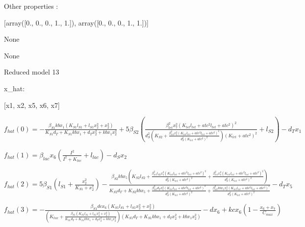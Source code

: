 Other properties :


[array([0., 0., 0., 1., 1.]), array([0., 0., 0., 1., 1.])]

None

None

Reduced model 13

x_{hat}: 

[x1, x2, x5, x6, x7]


$f_{hat}(0)=- \frac{\beta_{S1} kb x_{1} \left(K_{S1} l_{S1} + l_{S1} x_{2}^{2} + x_{2}^{2}\right)}{K_{S1} d_{T} + K_{S1} kb x_{1} + d_{T} x_{2}^{2} + kb x_{1} x_{2}^{2}} + 5 \beta_{S2} \left(\frac{\beta_{tet}^{2} x_{7}^{2} \left(K_{tet} l_{tet} + atc^{2} l_{tet} + atc^{2}\right)^{2}}{d_{S}^{2} \left(K_{S2} + \frac{\beta_{tet}^{2} x_{7}^{2} \left(K_{tet} l_{tet} + atc^{2} l_{tet} + atc^{2}\right)^{2}}{d_{S}^{2} \left(K_{tet} + atc^{2}\right)^{2}}\right) \left(K_{tet} + atc^{2}\right)^{2}} + l_{S2}\right) - d_{T} x_{1}$


$f_{hat}(1)=\beta_{lac} x_{6} \left(\frac{I^{2}}{I^{2} + K_{lac}} + l_{lac}\right) - d_{S} x_{2}$


$f_{hat}(2)=5 \beta_{S1} \left(l_{S1} + \frac{x_{2}^{2}}{K_{S1} + x_{2}^{2}}\right) - \frac{\beta_{S2} kb x_{5} \left(K_{S2} l_{S2} + \frac{\beta_{tet}^{2} l_{S2} x_{7}^{2} \left(K_{tet} l_{tet} + atc^{2} l_{tet} + atc^{2}\right)^{2}}{d_{S}^{2} \left(K_{tet} + atc^{2}\right)^{2}} + \frac{\beta_{tet}^{2} x_{7}^{2} \left(K_{tet} l_{tet} + atc^{2} l_{tet} + atc^{2}\right)^{2}}{d_{S}^{2} \left(K_{tet} + atc^{2}\right)^{2}}\right)}{K_{S2} d_{T} + K_{S2} kb x_{5} + \frac{\beta_{tet}^{2} d_{T} x_{7}^{2} \left(K_{tet} l_{tet} + atc^{2} l_{tet} + atc^{2}\right)^{2}}{d_{S}^{2} \left(K_{tet} + atc^{2}\right)^{2}} + \frac{\beta_{tet}^{2} kb x_{5} x_{7}^{2} \left(K_{tet} l_{tet} + atc^{2} l_{tet} + atc^{2}\right)^{2}}{d_{S}^{2} \left(K_{tet} + atc^{2}\right)^{2}}} - d_{T} x_{5}$


$f_{hat}(3)=- \frac{\beta_{S1} dc x_{6} \left(K_{S1} l_{S1} + l_{S1} x_{2}^{2} + x_{2}^{2}\right)}{\left(K_{tox} + \frac{\beta_{S1} \left(K_{S1} l_{S1} + l_{S1} x_{2}^{2} + x_{2}^{2}\right)}{K_{S1} d_{T} + K_{S1} kb x_{1} + d_{T} x_{2}^{2} + kb x_{1} x_{2}^{2}}\right) \left(K_{S1} d_{T} + K_{S1} kb x_{1} + d_{T} x_{2}^{2} + kb x_{1} x_{2}^{2}\right)} - d x_{6} + kc x_{6} \left(1 - \frac{x_{6} + x_{7}}{C_{max}}\right)$


